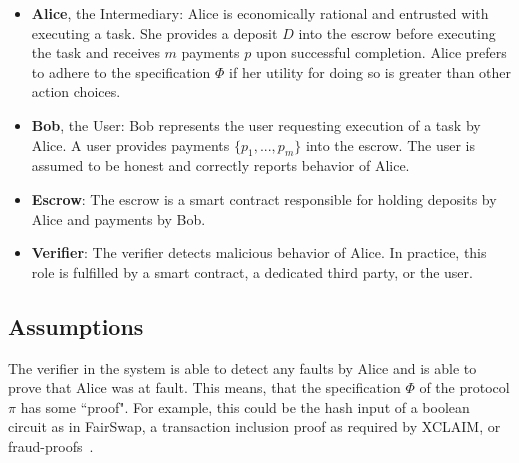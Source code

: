 \documentclass[runningheads]{llncs}
\newcommand{\rk}[1]{\todo[linecolor=red,backgroundcolor=red!25,bordercolor=blue,inline,caption={}]{Comment by Rami: #1}}
\newcommand{\dom}[1]{\todo[linecolor=green,backgroundcolor=green!25,bordercolor=green,inline,caption={}]{Comment by Dominik: #1}}
\begin{document}
\begin{itemize}
    \item \textbf{Alice}, the Intermediary: Alice is economically rational and entrusted with executing a task. She provides a deposit $D$ into the escrow before executing the task and receives $m$ payments $p$ upon successful completion. Alice prefers to adhere to the specification $\Phi$ if her utility for doing so is greater than other action choices.
    \item \textbf{Bob}, the User: Bob represents the user requesting execution of a task by Alice. A user provides payments $\{p_1, ..., p_m\}$ into the escrow. The user is assumed to be honest and correctly reports behavior of Alice. %
    \item \textbf{Escrow}: The escrow is a smart contract responsible for holding deposits by Alice and payments by Bob.
    \item \textbf{Verifier}: The verifier detects malicious behavior of Alice. In practice, this role is fulfilled by a smart contract, a dedicated third party, or the user.
\end{itemize}








\subsection{Assumptions}
\label{sec:assumptions}

The verifier in the system is able to detect any faults by Alice and is able to prove that Alice was at fault.
This means, that the specification $\Phi$ of the protocol $\pi$ has some ``proof".
For example, this could be the hash input of a boolean circuit as in FairSwap, a transaction inclusion proof as required by XCLAIM, or fraud-proofs~\cite{Al-Bassam2018}.
\end{document}
